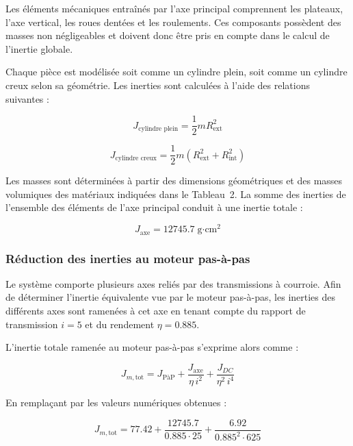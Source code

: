Les éléments mécaniques entraînés par l’axe principal comprennent les plateaux, l’axe vertical, les roues dentées et les roulements. Ces composants possèdent des masses non négligeables et doivent donc être pris en compte dans le calcul de l’inertie globale.

Chaque pièce est modélisée soit comme un cylindre plein, soit comme un cylindre creux selon sa géométrie. Les inerties sont calculées à l’aide des relations suivantes :

\begin{equation}
J_{\text{cylindre plein}} = \frac{1}{2} m R_{\text{ext}}^2
\end{equation}

\begin{equation}
J_{\text{cylindre creux}} = \frac{1}{2} m \left( R_{\text{ext}}^2 + R_{\text{int}}^2 \right)
\end{equation}

Les masses sont déterminées à partir des dimensions géométriques et des masses volumiques des matériaux indiquées dans le Tableau~2. La somme des inerties de l’ensemble des éléments de l’axe principal conduit à une inertie totale :

\begin{equation}
J_{\text{axe}} = 12745.7 \; \text{g·cm}^2
\end{equation}

\subsubsection{Réduction des inerties au moteur pas-à-pas}

Le système comporte plusieurs axes reliés par des transmissions à courroie. Afin de déterminer l’inertie équivalente vue par le moteur pas-à-pas, les inerties des différents axes sont ramenées à cet axe en tenant compte du rapport de transmission $i = 5$ et du rendement $\eta = 0.885$.

L’inertie totale ramenée au moteur pas-à-pas s’exprime alors comme :

\begin{equation}
J_{m,\text{tot}} =
J_{\text{PàP}}
+ \frac{J_{\text{axe}}}{\eta \, i^2}
+ \frac{J_{DC}}{\eta^2 \, i^4}
\end{equation}

En remplaçant par les valeurs numériques obtenues :

\begin{equation}
J_{m,\text{tot}} =
77.42
+ \frac{12745.7}{0.885 \cdot 25}
+ \frac{6.92}{0.885^2 \cdot 625}
\end{equation}

